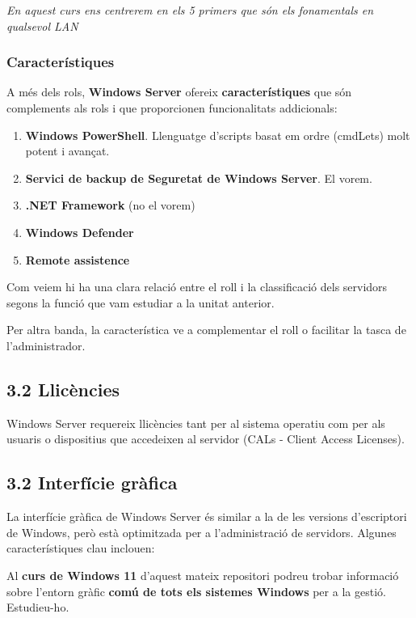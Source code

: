 \documentclass[
  a4paper,
]{article}
\begin{document}
\emph{En aquest curs ens centrerem en els 5 primers que són els
fonamentals en qualsevol LAN}

\subsubsection{Característiques}\label{caracteruxedstiques}

A més dels rols, \textbf{Windows Server} ofereix
\textbf{característiques} que són complements als rols i que
proporcionen funcionalitats addicionals:

\begin{enumerate}
\def\labelenumi{\arabic{enumi}.}
\item
  \textbf{Windows PowerShell}. Llenguatge d'scripts basat em ordre
  (cmdLets) molt potent i avançat.
\item
  \textbf{Servici de backup de Seguretat de Windows Server}. El vorem.
\item
  \textbf{.NET Framework} (no el vorem)
\item
  \textbf{Windows Defender}
\item
  \textbf{Remote assistence}
\end{enumerate}

Com veiem hi ha una clara relació entre el roll i la classificació dels
servidors segons la funció que vam estudiar a la unitat anterior.

Per altra banda, la característica ve a complementar el roll o facilitar
la tasca de l'administrador.

\subsection{3.2 Llicències}\label{llicuxe8ncies}

Windows Server requereix llicències tant per al sistema operatiu com per
als usuaris o dispositius que accedeixen al servidor (CALs - Client
Access Licenses).

\subsection{3.2 Interfície gràfica}\label{interfuxedcie-gruxe0fica}

La interfície gràfica de Windows Server és similar a la de les versions
d'escriptori de Windows, però està optimitzada per a l'administració de
servidors. Algunes característiques clau inclouen:

Al \textbf{curs de Windows 11} d'aquest mateix repositori podreu trobar
informació sobre l'entorn gràfic \textbf{comú de tots els sistemes
Windows} per a la gestió. Estudieu-ho.
\end{document}
